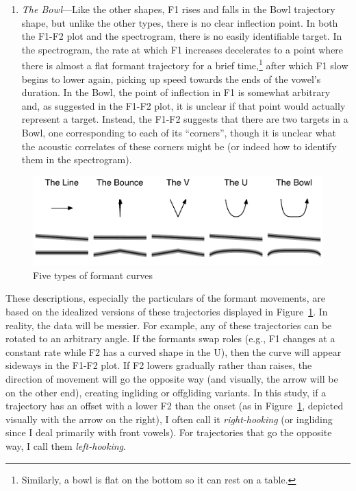 \begin{enumerate}
  \item \textit{The Bowl}---Like the other shapes, F1 rises and falls in the Bowl trajectory shape, but unlike the other types, there is no clear inflection point. In both the F1-F2 plot and the spectrogram, there is no easily identifiable target. In the spectrogram, the rate at which F1 increases decelerates to a point where there is almost a flat formant trajectory for a brief time,\footnote{Similarly, a bowl is flat on the bottom so it can rest on a table.} after which F1 slow begins to lower again, picking up speed towards the ends of the vowel's duration. In the Bowl, the point of inflection in F1 is somewhat arbitrary and, as suggested in the F1-F2 plot, it is unclear if that point would actually represent a target. Instead, the F1-F2 suggests that there are two targets in a Bowl, one corresponding to each of its ``corners'', though it is unclear what the acoustic correlates of these corners might be (or indeed how to identify them in the spectrogram).
\end{enumerate}

\begin{figure}[tb!]
    \centering
    \includegraphics[width = 6.5in]{Figures/other_figures/traj_shapes.pdf}
    \caption{Five types of formant curves}
    \label{fig:curve_types}
\end{figure}

These descriptions, especially the particulars of the formant movements, are based on the idealized versions of these trajectories displayed in Figure~\ref{fig:curve_types}. In reality, the data will be messier. For example, any of these trajectories can be rotated to an arbitrary angle. If the formants swap roles (e.g., F1 changes at a constant rate while F2 has a curved shape in the U), then the curve will appear sideways in the F1-F2 plot. If F2 lowers gradually rather than raises, the direction of movement will go the opposite way (and visually, the arrow will be on the other end), creating ingliding or offgliding variants. In this study, if a trajectory has an offset with a lower F2 than the onset (as in Figure~\ref{fig:curve_types}, depicted visually with the arrow on the right), I often call it \textit{right-hooking} (or ingliding since I deal primarily with front vowels). For trajectories that go the opposite way, I call them \textit{left-hooking}.

